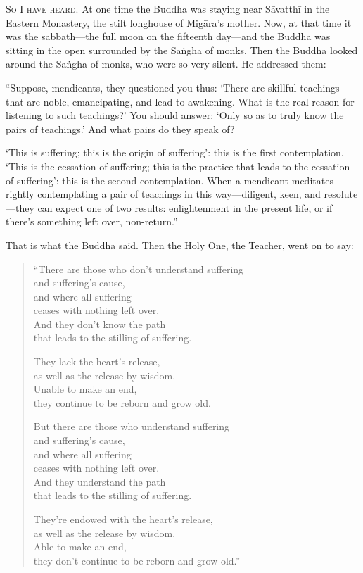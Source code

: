\documentclass[12pt,openany]{book}%
\newcommand*{\scevam}[1]{\textsc{#1}}
\begin{document}
\scevam{So I have heard. }At one time the Buddha was staying near \textsanskrit{Sāvatthī} in the Eastern Monastery, the stilt longhouse of \textsanskrit{Migāra}’s mother. Now, at that time it was the sabbath—the full moon on the fifteenth day—and the Buddha was sitting in the open surrounded by the \textsanskrit{Saṅgha} of monks. Then the Buddha looked around the \textsanskrit{Saṅgha} of monks, who were so very silent. He addressed them: 

“Suppose, mendicants, they questioned you thus: ‘There are skillful teachings that are noble, emancipating, and lead to awakening. What is the real reason for listening to such teachings?’ You should answer: ‘Only so as to truly know the pairs of teachings.’ And what pairs do they speak of? 

‘This is suffering; this is the origin of suffering’: this is the first contemplation. ‘This is the cessation of suffering; this is the practice that leads to the cessation of suffering’: this is the second contemplation. When a mendicant meditates rightly contemplating a pair of teachings in this way—diligent, keen, and resolute—they can expect one of two results: enlightenment in the present life, or if there’s something left over, non-return.” 

That is what the Buddha said. Then the Holy One, the Teacher, went on to say: 

\begin{verse}%
“There are those who don’t understand suffering \\
and suffering’s cause, \\
and where all suffering \\
ceases with nothing left over. \\
And they don’t know the path \\
that leads to the stilling of suffering. 

They lack the heart’s release, \\
as well as the release by wisdom. \\
Unable to make an end, \\
they continue to be reborn and grow old. 

But there are those who understand suffering \\
and suffering’s cause, \\
and where all suffering \\
ceases with nothing left over. \\
And they understand the path \\
that leads to the stilling of suffering. 

They’re endowed with the heart’s release, \\
as well as the release by wisdom. \\
Able to make an end, \\
they don’t continue to be reborn and grow old.” 

%
\end{verse}
\end{document}

